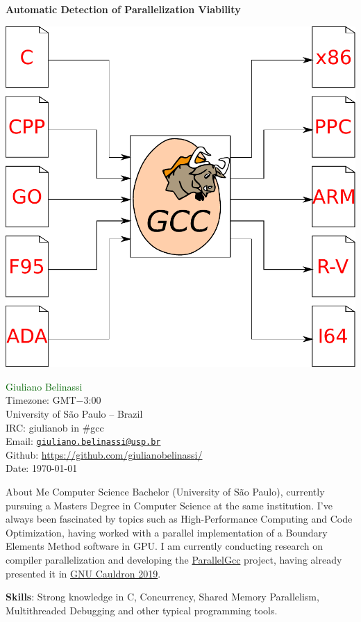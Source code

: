 \documentclass[12pt]{article}
\begin{document}
\newtheorem{theorem}{Teorema}%
\newtheorem{corollary}{Corolário}[theorem]
\newtheorem{lemma}[theorem]{Lema}

\begin{center}
\Huge \bf
Automatic Detection of Parallelization Viability
\vspace{0.5cm}
\end{center}
\vspace*{\fill}
{
     \centering
     \includegraphics[scale=0.7]{logo.pdf}
    \par
}
\vspace*{\fill}
\normalsize{
\noindent\textcolor{darkgreen}{Giuliano Belinassi} \\
Timezone: GMT$-$3:00 \\
University of São Paulo -- Brazil \\
IRC: giulianob in \#gcc \\
Email: \href{mailto:giuliano.belinassi@usp.br}{\texttt{giuliano.belinassi@usp.br}} \\
Github: \url{https://github.com/giulianobelinassi/} \\
Date: \today
}
\newpage

\begin{section}{About Me}
    Computer Science Bachelor (University of São Paulo),
    currently pursuing a Masters Degree in Computer Science at the same
    institution. I've always been fascinated by topics such as
    High-Performance Computing and Code Optimization, having worked with
    a parallel implementation of a Boundary Elements Method software in GPU.
    I am currently conducting research on compiler parallelization and
    developing the \href{https://gcc.gnu.org/wiki/ParallelGcc}{ParallelGcc} project,
    having already presented it in \href{https://www.youtube.com/watch?v=jd6R3IK\_\_1Q}{GNU Cauldron 2019}.

    \textbf{Skills}: Strong knowledge in C, Concurrency, Shared Memory Parallelism, Multithreaded Debugging and other typical programming tools.
\end{section}
\end{document}
